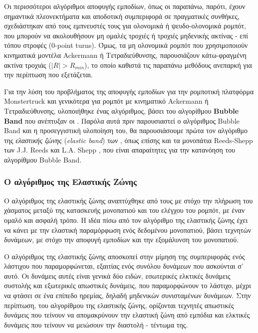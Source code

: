 \bigskip
Οι περισσότεροι αλγόριθμοι αποφυγής εμποδίων, όπως οι παραπάνω, παρότι, έχουν σημαντικά πλεονεκτήματα και αποδοτική συμπεριφορά σε πραγματικές συνθήκες, σχεδιάστηκαν από τους εμπνευστές τους για ολονομικά ή ψευδο-ολονομικά ρομπότ, που μπορούν να ακολουθήσουν μη ομαλές τροχιές ή τροχιές μηδενικής ακτίνας - επί τόπου στροφές (0-point turns). Όμως, τα μη ολονομικά ρομπότ που χρησιμοποιούν κινηματικά μοντέλα Ackermann ή Τετραδιεύθυνσης, παρουσιάζουν κάτω-φραγμένη ακτίνα τροχιάς ($|R| > R_{min}$), το οποίο καθιστά τις παραπάνω μεθόδους ανεπαρκή για την περίπτωση που εξετάζεται.

\bigskip
Για την λύση του προβλήματος της αποφυγής εμποδίων για την ρομποτική πλατφόρμα Monstertruck και γενικότερα για ρομπότ με κινηματικό Ackermann ή Τετραδιεύθυνσης, υλοποιήθηκε ένας αλγόριθμος, βάσει του αλγορίθμου \textbf{Bubble Band} που ανέπτυξαν οι \citeauthor{dpm} \cite{dpm}. Παρόλα αυτά πριν παρουσιαστεί ο αλγόριθμος Bubble Band και η προσεγγιστική υλοποίηση του, θα παρουσιάσουμε πρώτα τον αλγόριθμο της \textit{ελαστικής ζώνης} (\textit{elastic band}) των \citeauthor{eband} \cite{eband}, όπως επίσης και τα μονοπάτια Reeds-Shepp των J.J. Reeds και L.A. Shepp \cite{reeds_shepp}, που είναι απαραίτητες για την κατανόηση του αλγορίθμου Bubble Band.


\subsubsection{Ο αλγόριθμος της Ελαστικής Ζώνης} \label{sssec:eband}
Ο αλγόριθμος της ελαστικής ζώνης αναπτύχθηκε από τους \citeauthor{eband} \cite{eband} με στόχο την πλήρωση του χάσματος μεταξύ της κατασκευής μονοπατιού και του ελέγχου του ρομπότ, με έναν ομαλό και ασφαλή τρόπο. Η ιδέα πίσω από τον αλγόριθμο της ελαστικής ζώνης έχει να κάνει με την ελαστική παραμόρφωση ενός δεδομένου μονοπατιού, βάσει τεχνητών δυνάμεων, με στόχο την αποφυγή εμποδίων και την εξομάλυνση του μονοπατιού.

\bigskip
Ο αλγόριθμος της ελαστικής ζώνης αποσκοπεί στην μίμηση της συμπεριφοράς ενός λάστιχου που παραμορφώνεται, εξαιτίας ενός συνόλου δυνάμεων που ασκούνται σ' αυτό. Οι δυνάμεις αυτές είναι γενικά δύο ειδών, εσωτερικές ελκτικές δυνάμεις συστολής και εξωτερικές απωστικές δυνάμεις, που παραμορφώνουν το λάστιχο, μέχρι να φτάσει σε ένα επίπεδο ηρεμίας, δηλαδή μηδενικών συνισταμένων δυνάμεων. Στην περίπτωση, του αλγορίθμου της ελαστικής ζώνης, ορίζονται τεχνητές απωστικές δυνάμεις που τείνουν να απομακρύνουν την ελαστική ζώνη από εμπόδια και ελκτικές δυνάμεις που τείνουν να  μειώσουν την διαστολή - τέντωμα της.

